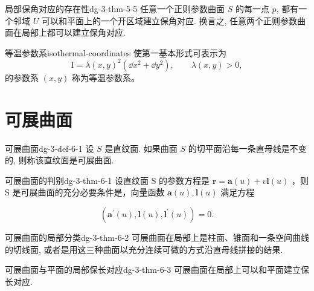 \begin{theorem}{局部保角对应的存在性}{dg-3-thm-5-5}
任意一个正则参数曲面 \(S\) 的每一点 \(p\), 都有一个邻域 \(U\) 可以和平面上的一个开区域建立保角对应. 换言之, 任意两个正则参数曲面在局部上都可以建立保角对应.
\end{theorem}

\begin{definition}{等温参数系}{isothermal-coordinates}
使第一基本形式可表示为
\[
\mathrm I=\lambda(x,y)^2(\dd x^2+\dd y^2),\qquad\lambda(x,y)>0,
\]
的参数系 $(x,y)$ 称为等温参数系。
\end{definition}

\section{可展曲面}

\begin{definition}{可展曲面}{dg-3-def-6-1}
设 \(S\) 是直纹面. 如果曲面 \(S\) 的切平面沿每一条直母线是不变的, 则称该直纹面是可展曲面.
\end{definition}

\begin{theorem}{可展曲面的判别}{dg-3-thm-6-1}
设直纹面 S 的参数方程是  \(\boldsymbol{r} = \boldsymbol{a}(u) + v\boldsymbol{l}(u)\) ，则 S 是可展曲面的充分必要条件是，向量函数  \(\boldsymbol{a}(u), \boldsymbol{l}(u)\)  满足方程\par

\begin{equation*}
(\boldsymbol {a} ^ {\prime} (u), \boldsymbol {l} (u), \boldsymbol {l} ^ {\prime} (u)) = 0.
\end{equation*}
\end{theorem}

\begin{theorem}{可展曲面的局部分类}{dg-3-thm-6-2}
可展曲面在局部上是柱面、锥面和一条空间曲线的切线面, 或者是用这三种曲面以充分连续可微的方式沿直母线拼接的结果.
\end{theorem}

\begin{theorem}{可展曲面与平面的局部保长对应}{dg-3-thm-6-3}
可展曲面在局部上可以和平面建立保长对应.
\end{theorem}

